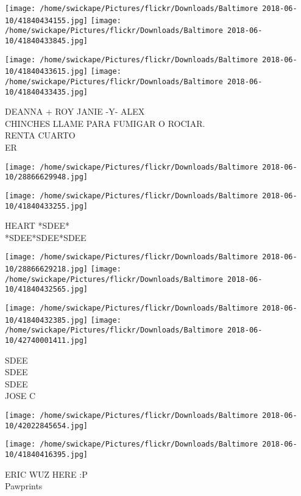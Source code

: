 \documentclass[10pt,letterpaper]{article}
\begin{document}
\texttt{[image: /home/swickape/Pictures/flickr/Downloads/Baltimore 2018-06-10/41840434155.jpg]}
\texttt{[image: /home/swickape/Pictures/flickr/Downloads/Baltimore 2018-06-10/41840433845.jpg]}

\texttt{[image: /home/swickape/Pictures/flickr/Downloads/Baltimore 2018-06-10/41840433615.jpg]}
\texttt{[image: /home/swickape/Pictures/flickr/Downloads/Baltimore 2018-06-10/41840433435.jpg]}

DEANNA + ROY JANIE {-}Y{-} ALEX\\
CHINCHES LLAME PARA FUMIGAR O ROCIAR.\\
RENTA CUARTO\\
ER\\
\pagebreak

\texttt{[image: /home/swickape/Pictures/flickr/Downloads/Baltimore 2018-06-10/28866629948.jpg]}

\vspace{0.25in}
\texttt{[image: /home/swickape/Pictures/flickr/Downloads/Baltimore 2018-06-10/41840433255.jpg]}

HEART *SDEE*\\
*SDEE*SDEE*SDEE\\
\pagebreak

\texttt{[image: /home/swickape/Pictures/flickr/Downloads/Baltimore 2018-06-10/28866629218.jpg]}
\texttt{[image: /home/swickape/Pictures/flickr/Downloads/Baltimore 2018-06-10/41840432565.jpg]}

\texttt{[image: /home/swickape/Pictures/flickr/Downloads/Baltimore 2018-06-10/41840432385.jpg]}
\texttt{[image: /home/swickape/Pictures/flickr/Downloads/Baltimore 2018-06-10/42740001411.jpg]}

SDEE\\
SDEE\\
SDEE\\
JOSE C\\
\pagebreak

\texttt{[image: /home/swickape/Pictures/flickr/Downloads/Baltimore 2018-06-10/42022845654.jpg]}

\vspace{0.25in}
\texttt{[image: /home/swickape/Pictures/flickr/Downloads/Baltimore 2018-06-10/41840416395.jpg]}

ERIC WUZ HERE :P\\
Pawprints\\
\pagebreak
\end{document}
